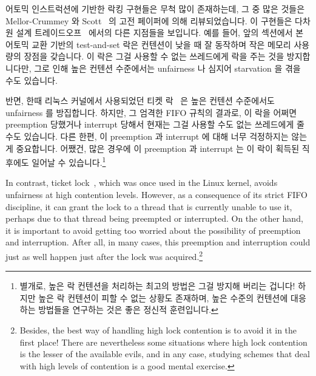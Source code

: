 어토믹 인스트럭션에 기반한 락킹 구현들은 무척 많이 존재하는데, 그 중 많은
것들은 Mellor-Crummey 와 Scott~\cite{MellorCrummey91a} 의 고전 페이퍼에 의해
리뷰되었습니다.
이 구현들은 다차원 설계
트레이드오프~\cite{Guerraoui:2019:LPA:3319851.3301501,HugoGuirouxPhD,McKenney96a}
에서의 다른 지점들을 보입니다.
예를 들어, 앞의 섹션에서 본 어토믹 교환 기반의 test-and-set 락은 컨텐션이 낮을
때 잘 동작하며 작은 메모리 사용량의 장점을 갖습니다.
이 락은 그걸 사용할 수 없는 쓰레드에게 락을 주는 것을 방지합니다만, 그로 인해
높은 컨텐션 수준에서는 unfairness 나 심지어 starvation 을 겪을 수도 있습니다.

반면, 한때 리눅스 커널에서 사용되었던 티켓 락~\cite{MellorCrummey91a} 은 높은
컨텐션 수준에서도 unfairness 를 방집합니다.
하지만, 그 엄격한 FIFO 규칙의 결과로, 이 락을 어쩌면 preemption 당했거나
interrupt 당해서 현재는 그걸 사용할 수도 없는 쓰레드에게 줄 수도 있습니다.
다른 한편, 이 preemption 과 interrupt 에 대해 너무 걱정하지는 않는게
중요합니다.
어쨌건, 많은 경우에 이 preemption 과 interrupt 는 이 락이 획득된 직후에도
일어날 수 있습니다.\footnote{
	별개로, 높은 락 컨텐션을 처리하는 최고의 방법은 그걸 방지해 버리는
	겁니다!
	하지만 높은 락 컨텐션이 피할 수 없는 상황도 존재하며, 높은 수준의
	컨텐션에 대응하는 방법들을 연구하는 것은 좋은 정신적 훈련입니다.}

\iffalse

In contrast, ticket lock~\cite{MellorCrummey91a}, which was once used
in the Linux kernel, avoids unfairness at high contention levels.
However, as a consequence of its strict FIFO discipline, it can grant
the lock to a thread that is currently unable to use it, perhaps due
to that thread being preempted or interrupted.
On the other hand, it is important to avoid getting too worried about the
possibility of preemption and interruption.
After all, in many cases, this preemption and interruption could just
as well happen just after the lock was
acquired.\footnote{
	Besides, the best way of handling high lock contention is to avoid
	it in the first place!
	There are nevertheless some situations where high lock contention
	is the lesser of the available evils, and in any case, studying
	schemes that deal with high levels of contention is a good mental
	exercise.}

